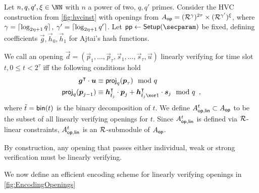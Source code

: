 \begin{definition}\label{def:linearlygoodopenings}
Let $n,q,q',\xi\in\NN$ with $n$ a power of two, $q,q'$ primes.
Consider the HVC construction from \autoref{fig:hvcinst} with openings from
$A_{\mathsf{op}} = (\mathcal{R}^\gamma)^{2\tau} \times (\mathcal{R}^{\gamma'})^\xi$, where $\gamma = \lceil\log_{2\eta+1}q\rceil$, $\gamma' = \lceil\log_{2\eta+1}q'\rceil$.
Let $\params\gets\setup(\secparam)$ be fixed, defining coefficients $\vec{g},\vec{h}_0,\vec{h}_1$ for Ajtai's hash functions.

We call an opening $\vec{d} = (\vec{p}_1,\ldots,\vec{p}_\tau, \vec{s}_1,\ldots,\vec{s}_\tau,\vec{u})$ linearly verifying for time slot $t, 0\leq t<2^\tau$ iff the following conditions hold
\begin{align*}
\vec{g}^\transpose \cdot \vec{u} &\equiv \proj_q(\vec{p}_\tau) \mod q\\
\proj_q(\vec{p}_{j-1}) &\equiv \vec{h}_{\tilde t_j}^\transpose\cdot \vec{p}_{j} + \vec{h}_{\tilde t_j \xor 1}^\transpose \cdot \vec{s}_{j} \mod q\enspace,
\end{align*}
where $\tilde{t} = \mathsf{bin}(t)$ is the binary decomposition of $t$. We define $A_{\mathsf{op,lin}}^{t}\subset A_{\mathsf{op}}$ to be the subset of all linearly verifying openings for $t$.
Since $A_{\mathsf{op,lin}}^{t}$ is defined via $\mathcal{R}$-linear constraints, $A_{\mathsf{op,lin}}^{t}$ is an $\mathcal{R}$-submodule of $A_{\mathsf{op}}$.
\end{definition}
By construction, any opening that passes either individual, weak or strong verification must be linearly verifying.

We now define an efficient encoding scheme for linearly verifying openings in \autoref{fig:EncodingOpenings}

